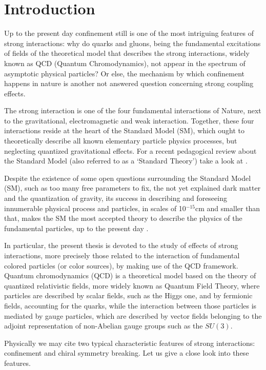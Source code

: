 
\chapter{Introduction}


Up to the present day confinement still is one of the most intriguing features of strong
interactions: why do quarks and gluons, being the fundamental excitations of fields of the
theoretical model that describes the strong interactions, widely known as QCD (Quantum
Chromodynamics), not appear in the spectrum of asymptotic physical particles? Or else, the
mechanism by which confinement happens in nature is another not answered question concerning strong coupling effects.

The strong interaction is one of the four fundamental interactions of Nature, next to the
gravitational, electromagnetic and weak interaction. Together, these four interactions reside
at the heart of the Standard Model (SM), which ought to theoretically describe all known
elementary particle physics processes, but neglecting quantized gravitational effects. For a
recent pedagogical review about the Standard Model (also referred to as a `Standard
Theory') take a look at \cite{'tHooft:2007zza}.

Despite the existence of some open questions surrounding the Standard Model (SM), such as too
many free parameters to fix, the not yet explained dark matter and
the quantization of gravity, its success in describing and foreseeing innumerable physical
process and particles, in scales of 10$^{-15}$cm and smaller than that, makes the SM the most
accepted theory to describe the physics of the fundamental particles, up to the present day \cite{Agashe:2014kda}. 

In particular, the present thesis is devoted to the study of effects of strong interactions,
more precisely those related to the interaction of fundamental colored particles (or color
sources), by making use of the QCD framework. Quantum chromodynamics (QCD) is a theoretical
model based on the theory of quantized relativistic fields, more widely known as Quantum Field
Theory, where particles are described by scalar fields, such as the Higgs one, and by
fermionic fields, accounting for the quarks, while the interaction between those particles
is mediated by gauge particles, which are described by vector fields
belonging to the adjoint representation of non-Abelian gauge groups such as the $SU(3)$.

Physically we may cite two typical characteristic features of strong interactions: confinement
and chiral symmetry breaking. Let us give a close look into these features.




